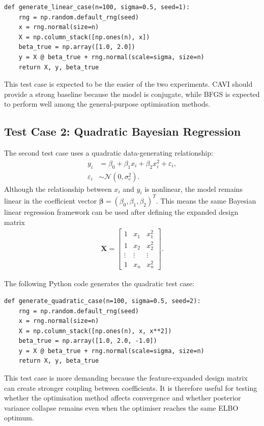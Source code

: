 \documentclass[11pt,a4paper]{article}
\newcommand{\N}{\mathcal{N}}
\begin{document}
\begin{verbatim}
def generate_linear_case(n=100, sigma=0.5, seed=1):
    rng = np.random.default_rng(seed)
    x = rng.normal(size=n)
    X = np.column_stack([np.ones(n), x])
    beta_true = np.array([1.0, 2.0])
    y = X @ beta_true + rng.normal(scale=sigma, size=n)
    return X, y, beta_true
\end{verbatim}

This test case is expected to be the easier of the two experiments. CAVI should provide a strong baseline because the model is conjugate, while BFGS is expected to perform well among the general-purpose optimisation methods.

\subsection*{Test Case 2: Quadratic Bayesian Regression}

The second test case uses a quadratic data-generating relationship:
\begin{align}
y_i &= \beta_0 + \beta_1 x_i + \beta_2 x_i^2 + \varepsilon_i,\\
\varepsilon_i &\sim \N(0,\sigma_e^2).
\end{align}
Although the relationship between $x_i$ and $y_i$ is nonlinear, the model remains linear in the coefficient vector $\bm{\beta}=(\beta_0,\beta_1,\beta_2)^T$. This means the same Bayesian linear regression framework can be used after defining the expanded design matrix
\begin{align}
\bm{X} =
\begin{bmatrix}
1 & x_1 & x_1^2\\
1 & x_2 & x_2^2\\
\vdots & \vdots & \vdots\\
1 & x_n & x_n^2
\end{bmatrix}.
\end{align}

The following Python code generates the quadratic test case:

\begin{verbatim}
def generate_quadratic_case(n=100, sigma=0.5, seed=2):
    rng = np.random.default_rng(seed)
    x = rng.normal(size=n)
    X = np.column_stack([np.ones(n), x, x**2])
    beta_true = np.array([1.0, 2.0, -1.0])
    y = X @ beta_true + rng.normal(scale=sigma, size=n)
    return X, y, beta_true
\end{verbatim}

This test case is more demanding because the feature-expanded design matrix can create stronger coupling between coefficients. It is therefore useful for testing whether the optimisation method affects convergence and whether posterior variance collapse remains even when the optimiser reaches the same ELBO optimum.
\end{document}
